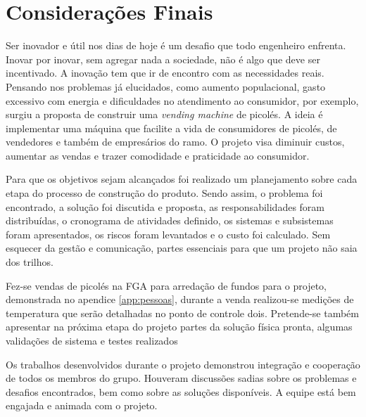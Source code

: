 \chapter{Considerações Finais}


Ser inovador e útil nos dias de hoje é um desafio que todo engenheiro enfrenta. Inovar por inovar, sem agregar nada a sociedade, não é algo que deve ser incentivado. A inovação tem que ir de encontro com as necessidades reais. Pensando nos problemas já elucidados, como aumento populacional, gasto excessivo com energia e dificuldades no atendimento ao consumidor, por exemplo, surgiu a  proposta de construir uma  \textit{vending machine} de picolés.  A ideia é implementar uma máquina que facilite a vida de consumidores de picolés, de vendedores  e também de empresários do ramo. O projeto visa diminuir custos, aumentar as vendas e trazer comodidade e praticidade ao consumidor. 

Para que os objetivos sejam alcançados foi realizado um planejamento sobre cada etapa do processo de construção do produto. Sendo assim, o problema foi encontrado, a solução foi discutida e proposta, as responsabilidades foram distribuídas, o cronograma de atividades definido, os sistemas e subsistemas foram apresentados, os riscos foram levantados e o custo foi calculado. Sem esquecer da gestão e comunicação, partes essenciais para que um projeto não saia dos trilhos. 

Fez-se vendas de picolés na FGA para arredação de fundos para o projeto, demonstrada no apendice \ref{app:pessoas}, durante a venda realizou-se medições de temperatura que serão detalhadas no ponto de controle dois. Pretende-se também apresentar na próxima etapa do projeto partes da solução física pronta, algumas validações de sistema e testes realizados

Os trabalhos desenvolvidos durante o projeto demonstrou integração e cooperação de todos os membros do grupo. Houveram discussões sadias sobre os problemas e desafios encontrados, bem como sobre as soluções disponíveis. A equipe está bem engajada e animada com o projeto.






